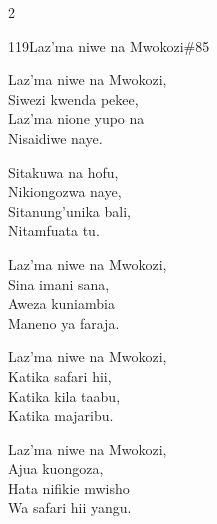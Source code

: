 \begin{multicols}{2}
\begin{hymn}{119}{Laz'ma niwe na Mwokozi}{\#85}
\begin{stanza}
Laz'ma niwe na Mwokozi,\\
Siwezi kwenda pekee,\\
Laz'ma nione yupo na\\
Nisaidiwe naye.
\end{stanza}
\begin{chorus}
Sitakuwa na hofu,\\
Nikiongozwa naye,\\
Sitanung'unika bali,\\
Nitamfuata tu.
\end{chorus}
\begin{stanza}
Laz'ma niwe na Mwokozi,\\
Sina imani sana,\\
Aweza kuniambia\\
Maneno ya faraja.
\end{stanza}
\begin{stanza}
Laz'ma niwe na Mwokozi,\\
Katika safari hii,\\
Katika kila taabu,\\
Katika majaribu.
\end{stanza}
\begin{stanza}
Laz'ma niwe na Mwokozi,\\
Ajua kuongoza,\\
Hata nifikie mwisho\\
Wa safari hii yangu.
\end{stanza}
\end{hymn}


\end{multicols}
